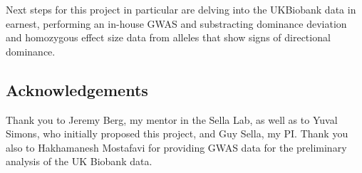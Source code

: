 \documentclass[a4paper,12pt]{article}
\begin{document}
Next steps for this project in particular are delving into the
UKBiobank data in earnest, performing an in-house GWAS and
substracting dominance deviation and homozygous effect size data from
alleles that show signs of directional dominance.

\subsection*{Acknowledgements}
Thank you to Jeremy Berg, my mentor in the Sella Lab, as well as to
Yuval Simons, who initially proposed this project, and Guy Sella, my
PI. Thank you also to Hakhamanesh Mostafavi for providing GWAS data
for the preliminary analysis of the UK Biobank data. 


\pagebreak


\end{document}
